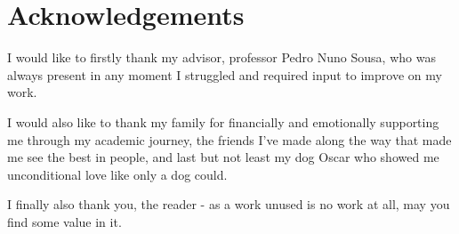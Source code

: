 \chapter{Acknowledgements}

    I would like to firstly thank my advisor, professor Pedro Nuno Sousa, who was always present in any moment I struggled and required input to improve on my work.

    I would also like to thank my family for financially and emotionally supporting me through my academic journey, the friends I've made along the way that made me see the best in people, and last but not least my dog Oscar who showed me unconditional love like only a dog could.

    I finally also thank you, the reader - as a work unused is no work at all, may you find some value in it.
